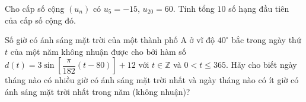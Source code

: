 \begin{bt}%
	Cho cấp số cộng $\left(u_n\right)$ có $u_5=-15$, $u_{20}=60$. Tính tổng $10$ số hạng đầu tiên của cấp số cộng đó.
\end{bt}
\begin{bt}
	Số giờ có ánh sáng mặt trời của một thành phố A ở vĩ độ $40^\circ$ bắc trong ngày thứ $t$ của một năm không nhuận được cho bởi hàm số $d\left( t \right) = 3\sin \left[ {\dfrac{\pi }{{182}}\left( {t - 80} \right)} \right] + 12$  với $t \in \mathbb{Z}$ và $0<t \le 365$. Hãy cho biết ngày tháng nào có nhiều giờ có ánh sáng mặt trời nhất và ngày tháng nào có ít giờ có ánh sáng mặt trời nhất trong năm (không nhuận)?
\end{bt}
